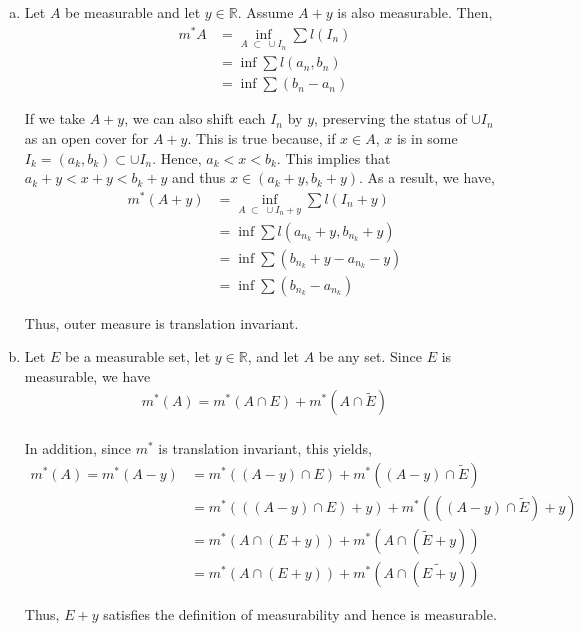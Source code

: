 \documentclass[12pt]{article}
\begin{document}
\begin{enumerate}[a)]

\item Let $A$ be measurable and let $y \in \mathbb{R}$. Assume $A + y$ is also measurable. Then,
\begin{align*}
m^*A &= \inf_{A \; \subset \; \cup I_n} \sum l(I_n)\\
&= \inf \sum l(a_{n}, b_{n})\\
&= \inf \sum (b_{n} - a_{n})
\end{align*}

If we take $A + y$, we can also shift each $I_n$ by $y$, preserving the status of $\cup I_n$ as an open cover for $A + y$. This is true because, if $x \in A$, $x$ is in some $I_k = (a_k, b_k) \subset \cup I_n$. Hence, $a_k < x < b_k$. This implies that $a_k + y < x + y < b_k + y$ and thus $x \in (a_k + y, b_k + y)$. As a result, we have,
\begin{align*}
m^*(A+y) &= \inf_{A \; \subset \; \cup I_n + y} \sum l(I_n + y)\\
&= \inf \sum l(a_{n_k} + y, b_{n_k} + y)\\
&= \inf \sum (b_{n_k} + y - a_{n_k} - y)\\
&= \inf \sum (b_{n_k} - a_{n_k})
\end{align*}

Thus, outer measure is translation invariant.

\item Let $E$ be a measurable set, let $y \in \mathbb{R}$, and let $A$ be any set. Since $E$ is measurable, we have
\begin{align*}
m^*(A) = m^*(A \cap E) + m^*(A \cap \tilde{E})\\
\end{align*}

In addition, since $m^*$ is translation invariant, this yields,
\begin{align*}
m^*(A) = m^*(A-y) &= m^*((A-y) \cap E) + m^*((A - y) \cap \tilde{E})\\
&= m^*(((A-y) \cap E) + y) + m^*(((A - y) \cap \tilde{E}) + y)\\
&= m^*(A \cap (E+y)) + m^*(A \cap (\tilde{E} + y))\\
&= m^*(A \cap (E+y)) + m^*(A \cap (\widetilde{E + y}))
\end{align*}

Thus, $E + y$ satisfies the definition of measurability and hence is measurable.

\end{enumerate}
\end{document}
